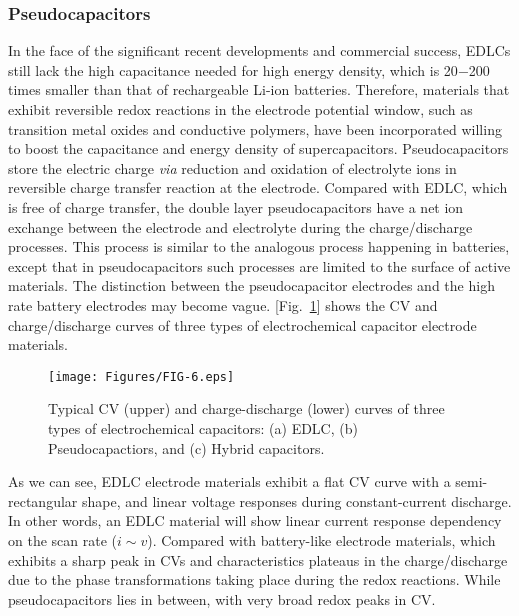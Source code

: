\documentclass[reprint,amsmath,amssymb,aps,floatfix,
]{revtex4-2}
\begin{document}
\subsubsection{Pseudocapacitors}
In the face of the significant recent developments and commercial success, EDLCs still lack the high capacitance needed for high energy density, which is 20$-$200 times smaller than that of rechargeable Li-ion batteries. Therefore, materials that exhibit reversible redox reactions in the electrode potential window, such as transition metal oxides and conductive polymers, have been incorporated willing to boost the capacitance and energy density of supercapacitors. Pseudocapacitors store the electric charge {\it via} reduction and oxidation of electrolyte ions in reversible charge transfer reaction at the electrode. Compared with EDLC, which is free of charge transfer, the double layer pseudocapacitors have a net ion exchange between the electrode and electrolyte during the charge/discharge processes. This process is similar to the analogous process happening in batteries, except that in pseudocapacitors such processes are limited to the surface of active materials. The distinction between the pseudocapacitor electrodes and the high rate battery electrodes may become vague. [Fig.~\ref{fig:fig6}] shows the CV and charge/discharge curves of three types of electrochemical capacitor electrode materials.
\begin{figure}[t]
    \centering
    \texttt{[image: Figures/FIG-6.eps]}
    \caption{\label{fig:fig6}Typical CV (upper) and charge-discharge (lower) curves of three types of electrochemical capacitors: (a) EDLC, (b) Pseudocapactiors, and (c) Hybrid capacitors.}
    \end{figure}
As we can see, EDLC electrode materials exhibit a flat CV curve with a semi-rectangular shape, and linear voltage responses during constant-current discharge. In other words, an EDLC material will show linear current response dependency on the scan rate ($i \sim v$). Compared with battery-like electrode materials, which exhibits a sharp peak in CVs and characteristics plateaus in the charge/discharge due to the phase transformations taking place during the redox reactions. While pseudocapacitors lies in between, with very broad redox peaks in CV.
\end{document}
